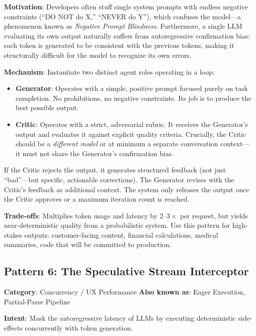 \textbf{Motivation}: Developers often stuff single system prompts with endless negative constraints (``DO NOT do X,'' ``NEVER do Y''), which confuses the model---a phenomenon known as \emph{Negative Prompt Blindness}. Furthermore, a single LLM evaluating its own output naturally suffers from autoregressive confirmation bias: each token is generated to be consistent with the previous tokens, making it structurally difficult for the model to recognize its own errors.

\textbf{Mechanism}: Instantiate two distinct agent roles operating in a loop:

\begin{itemize}[leftmargin=*]
    \item \textbf{Generator}: Operates with a simple, positive prompt focused purely on task completion. No prohibitions, no negative constraints. Its job is to produce the best possible output.
    \item \textbf{Critic}: Operates with a strict, adversarial rubric. It receives the Generator's output and evaluates it against explicit quality criteria. Crucially, the Critic should be a \emph{different model} or at minimum a separate conversation context---it must not share the Generator's confirmation bias.
\end{itemize}

If the Critic rejects the output, it generates structured feedback (not just ``bad''---but specific, actionable corrections). The Generator revises with the Critic's feedback as additional context. The system only releases the output once the Critic approves or a maximum iteration count is reached.

\textbf{Trade-offs}: Multiplies token usage and latency by $2$--$3\times$ per request, but yields near-deterministic quality from a probabilistic system. Use this pattern for high-stakes outputs: customer-facing content, financial calculations, medical summaries, code that will be committed to production.


\subsection{Pattern 6: The Speculative Stream Interceptor}

\textbf{Category}: Concurrency / UX Performance \hfill \textbf{Also known as}: Eager Execution, Partial-Parse Pipeline

\textbf{Intent}: Mask the autoregressive latency of LLMs by executing deterministic side-effects concurrently with token generation.

